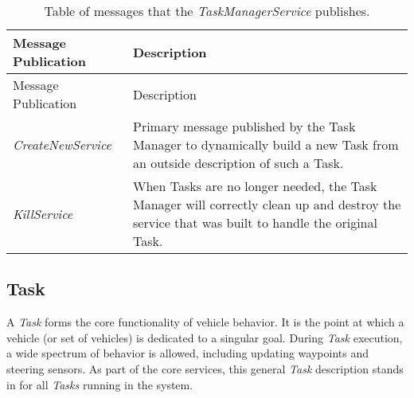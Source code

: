 \begin{longtable}[c]{@{}ll@{}}
\caption{Table of messages that the \emph{TaskManagerService}
publishes.}\tabularnewline
\toprule
\begin{minipage}[b]{0.29\columnwidth}\raggedright\strut
Message Publication
\strut\end{minipage} &
\begin{minipage}[b]{0.65\columnwidth}\raggedright\strut
Description
\strut\end{minipage}\tabularnewline
\midrule
\endfirsthead
\toprule
\begin{minipage}[b]{0.29\columnwidth}\raggedright\strut
Message Publication
\strut\end{minipage} &
\begin{minipage}[b]{0.65\columnwidth}\raggedright\strut
Description
\strut\end{minipage}\tabularnewline
\midrule
\endhead
\begin{minipage}[t]{0.29\columnwidth}\raggedright\strut
\emph{CreateNewService}
\strut\end{minipage} &
\begin{minipage}[t]{0.65\columnwidth}\raggedright\strut
Primary message published by the Task Manager to dynamically build a new
Task from an outside description of such a Task.
\strut\end{minipage}\tabularnewline
\begin{minipage}[t]{0.29\columnwidth}\raggedright\strut
\emph{KillService}
\strut\end{minipage} &
\begin{minipage}[t]{0.65\columnwidth}\raggedright\strut
When Tasks are no longer needed, the Task Manager will correctly clean
up and destroy the service that was built to handle the original Task.
\strut\end{minipage}\tabularnewline
\bottomrule
\end{longtable}

\subsection{Task}\label{task}

A \emph{Task} forms the core functionality of vehicle behavior. It is
the point at which a vehicle (or set of vehicles) is dedicated to a
singular goal. During \emph{Task} execution, a wide spectrum of behavior
is allowed, including updating waypoints and steering sensors. As part
of the core services, this general \emph{Task} description stands in for
all \emph{Tasks} running in the system.

